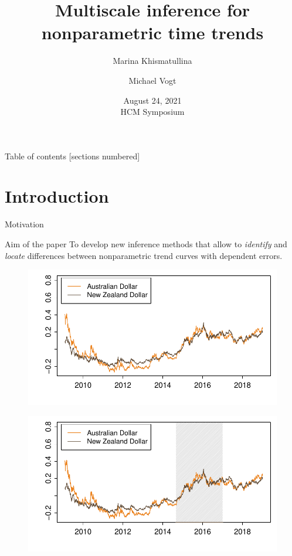 \documentclass[10pt, handout]{beamer}
\title{Multiscale inference for nonparametric time trends}
\date{August 24, 2021\\ HCM Symposium}
\author{Marina Khismatullina \and Michael Vogt}
\begin{document}
\maketitle

\begin{frame}{Table of contents}
  [sections numbered]
  \tableofcontents[hideallsubsections]
\end{frame}

\section{Introduction}


\begin{frame}{Motivation}

{ \begin{block}{Aim of the paper}
	To develop new inference methods that allow to \textit{identify} and \textit{locate} differences between nonparametric trend curves with dependent errors.
\end{block}}
	{\begin{figure}
    		\centering
    		\includegraphics[height=0.45\textheight]{plots/exchange_rates.pdf}
  	\end{figure}}
	{\onslide<3>
	\vspace{-46,81mm}
	\begin{figure}
    		\centering
    		\includegraphics[height=0.45\textheight]{plots/exchange_rates_1.pdf}

\end{figure}}
\end{frame}
\end{document}

